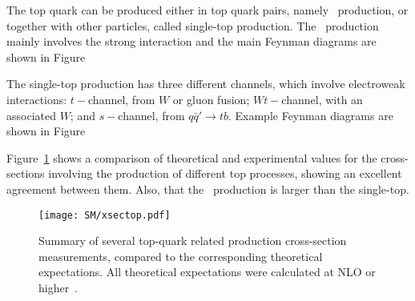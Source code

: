 The top quark can be produced either in top quark pairs, namely \ttbar\ production, or together with other particles, called single-top production. The \ttbar\ production mainly involves the strong interaction and the main Feynman diagrams are shown in Figure%


The single-top production has three different channels, which involve electroweak interactions: $t-$channel, from $W$ or gluon fusion; $Wt-$channel, with an associated $W$; and $s-$channel, from $q\bar{q}'\to tb$. Example Feynman diagrams are shown in Figure%


Figure~\ref{figSM:topcrossection} shows a comparison of theoretical and experimental values for the cross-sections involving the production of different top processes, showing an excellent agreement between them. Also, that the \ttbar\ production is larger than the single-top.

\begin{figure}[htbp]
    \RawFloats
    \begin{center}
    \texttt{[image: SM/xsectop.pdf]}
    \caption{
        Summary of several top-quark related production cross-section measurements, compared to the corresponding theoretical expectations. All theoretical expectations were calculated at NLO or higher~\cite{ATL-PHYS-PUB-2022-031}.
    }
    \label{figSM:topcrossection}
    \end{center}
\end{figure}

